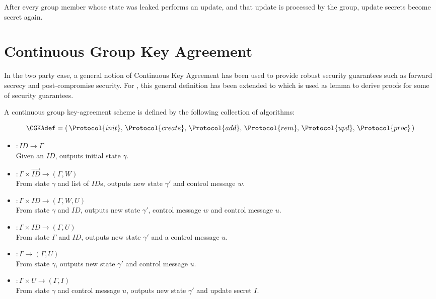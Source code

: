 \begin{definition}
After every group member whose state was leaked performs an update, and that update is processed by the group, update secrets become secret again.
\end{definition}


\hypertarget{sec:CGKA}{%
\section{Continuous Group Key Agreement}\label{sec:CGKA}}

In the two party case, a general notion of Continuous Key Agreement \autocite{alwen2019double} has been used to provide robust security guarantees such as forward secrecy and post-compromise security.
For , this general definition has been extended to  \autocite{alwen2020security} which is used as lemma to derive proofs for some of  security guarantees.

A continuous group key-agreement scheme is defined by the following collection of algorithms:

\[ \CGKAdef = \left(\,\Protocol{init},\, \Protocol{create},\, \Protocol{add},\, \Protocol{rem},\, \Protocol{upd},\, \Protocol{proc}\,\right) \]

\begin{itemize}
\item {}   \(: ID \to \Gamma\)\\
  Given an \(ID\), outputs initial state \(\gamma\).
\item {} \(: \Gamma \times \overrightarrow{ID} \to (\Gamma, W)\)\\
  From state \(\gamma\) and list of \(ID\)s, outputs new state \(\gamma'\) and control message \(w\).
\item {}    \(: \Gamma \times ID \to (\Gamma, W, U)\)\\
  From state \(\gamma\) and \(ID\), outputs new state \(\gamma'\), control message \(w\) and control message \(u\).
\item {}    \(: \Gamma \times ID \to (\Gamma, U)\)\\
  From state \(\Gamma\) and \(ID\), outputs new state \(\gamma'\) and a control message \(u\).
\item {}    \(: \Gamma \to (\Gamma, U)\)\\
  From state \(\gamma\), outputs new state \(\gamma'\) and control message \(u\).
\item {}   \(: \Gamma \times U \to (\Gamma, I)\)\\
  From state \(\gamma\) and control message \(u\), outputs new state \(\gamma'\) and update secret \(I\).
\end{itemize}

